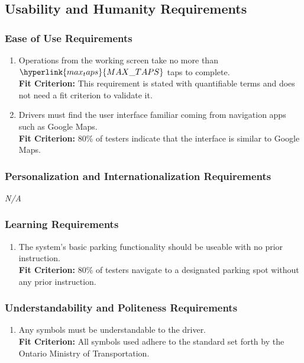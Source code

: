 \documentclass[12pt,letterpaper]{article}
\begin{document}
\subsection{Usability and Humanity Requirements}
\subsubsection{Ease of Use Requirements}
\begin{enumerate}[{UH}1.] 
    \item Operations from the working screen take no more than $\hyperlink{max_taps}{MAX\_TAPS}$ taps to complete.\\
    \textbf{Fit Criterion:} This requirement is stated with quantifiable terms and does not need a fit criterion to validate it. 
    \item Drivers must find the user interface familiar coming from navigation apps such as Google Maps.\\
    \textbf{Fit Criterion:} 80\% of testers indicate that the interface is similar to Google Maps.
\end{enumerate}

\subsubsection{Personalization and Internationalization Requirements}
\noindent \emph{N/A}

\subsubsection{Learning Requirements}
\begin{enumerate}[resume*] 
    \item The system's basic parking functionality should be useable with no prior instruction. \label{pocnf2}\\
    \textbf{Fit Criterion:} 80\% of testers navigate to a designated parking spot without any prior instruction. 
\end{enumerate}

\subsubsection{Understandability and Politeness Requirements}
\begin{enumerate}[resume*] 
    \item Any symbols must be understandable to the driver. \label{pocnf3} \\
    \textbf{Fit Criterion:} All symbols used adhere to the standard set forth by the Ontario Ministry of Transportation.
\end{enumerate}
\end{document}
